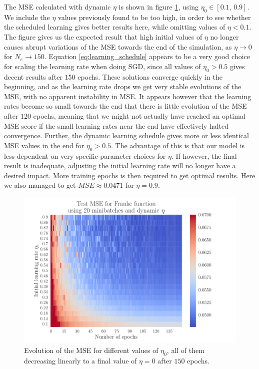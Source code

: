 \documentclass[12pt]{extarticle}
\begin{document}
The MSE calculated with dynamic $\eta$ is shown in figure \ref{fig:SGD_Franke_epochs_dynamic_eta}, using $\eta_0\in[0.1,\,0.9]$. We include the $\eta$ values previously found to be too high, in order to see whether the scheduled learning gives better results here, while omitting values of $\eta<0.1$. The figure gives us the expected result that high initial values of $\eta$ no longer causes abrupt variations of the MSE towards the end of the simulation, as $\eta\to0$ for $N_e\to150$. Equation \eqref{eq:learning_schedule} appears to be a very good choice for scaling the learning rate when doing SGD, since all values of $\eta_0>0.5$ gives decent results after $150$ epochs. These solutions converge quickly in the beginning, and as the learning rate drops we get very stable evolutions of the MSE, with no apparent instability in MSE. It appears however that the learning rates become so small towards the end that there is little evolution of the MSE after $120$ epochs, meaning that we might not actually have reached an optimal MSE score if the small learning rates near the end have effectively halted convergence. Further, the dynamic learning schedule gives more or less identical MSE values in the end for $\eta_0>0.5$. The advantage of this is that our model is less dependent on very specific parameter choices for $\eta$. If however, the final result is inadequate, adjusting the initial learning rate will no longer have a desired impact. More training epochs is then required to get optimal results. Here we also managed to get $MSE \approx 0.0471$ for $\eta = 0.9$.

\begin{figure}[h!]
	\includegraphics[width=0.9\linewidth]{SGD_Franke/reg_Franke__epochs_dynamic_eta__Test_MSE__792536.pdf}
	\caption{Evolution of the MSE for different values of $\eta_0$, all of them decreasing linearly to a final value of $\eta=0$ after $150$ epochs.}
	\label{fig:SGD_Franke_epochs_dynamic_eta}
\end{figure}
\end{document}
